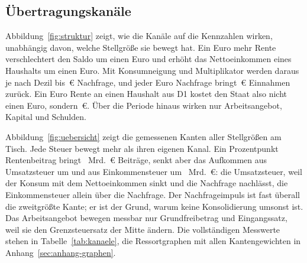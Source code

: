 \begin{table}[tbp]
\centering\footnotesize
\setlength{\tabcolsep}{4pt}
\caption{Zerlegung der Saldowirkung in der ersten Periode (2025--2028,
Jahreswert). Anteile in Prozent der Gesamtwirkung, nur wo diese mindestens
0,05~Mrd.~\euro{} beträgt. Die feste Ausweichquote der Mindeststeuer und die
Klammern der Reaktionen zählen zur mechanischen Wirkung.}
\label{tab:zerlegung}

\end{table}

\subsection{Übertragungskanäle}
\label{sec:kanaele}

Abbildung~\ref{fig:struktur} zeigt, wie die Kanäle auf die Kennzahlen wirken,
unabhängig davon, welche Stellgröße sie bewegt hat. Ein Euro mehr Rente
verschlechtert den Saldo um einen Euro und erhöht das Nettoeinkommen eines
Haushalts um einen Euro. Mit Konsumneigung und Multiplikator werden daraus je
nach Dezil \WnachfrDzehnc{} bis \WnachfrDeins\,\euro{} Nachfrage, und jeder Euro
Nachfrage bringt \Wstabil\,\euro{} Einnahmen zurück. Ein Euro Rente an einen
Haushalt aus D1 kostet den Staat also nicht einen Euro, sondern
\WkostenDeins\,\euro. Über die Periode hinaus wirken nur Arbeitsangebot, Kapital
und Schulden.

Abbildung~\ref{fig:uebersicht} zeigt die gemessenen Kanten aller Stellgrößen am
Tisch. Jede Steuer bewegt mehr als ihren eigenen Kanal. Ein Prozentpunkt
Rentenbeitrag bringt ~Mrd.~\euro{} Beiträge, senkt aber das
Aufkommen aus Umsatzsteuer um  und aus Einkommensteuer um
~Mrd.~\euro: die Umsatzsteuer, weil der Konsum mit dem
Nettoeinkommen sinkt und die Nachfrage nachlässt, die Einkommensteuer allein über
die Nachfrage. Der Nachfrageimpuls ist fast überall die zweitgrößte Kante; er ist
der Grund, warum keine Konsolidierung umsonst ist. Das Arbeitsangebot bewegen
messbar nur Grundfreibetrag und Eingangssatz, weil sie den Grenzsteuersatz der
Mitte ändern. Die vollständigen Messwerte stehen in
Tabelle~\ref{tab:kanaele}, die Ressortgraphen mit allen Kantengewichten in
Anhang~\ref{sec:anhang-graphen}.

